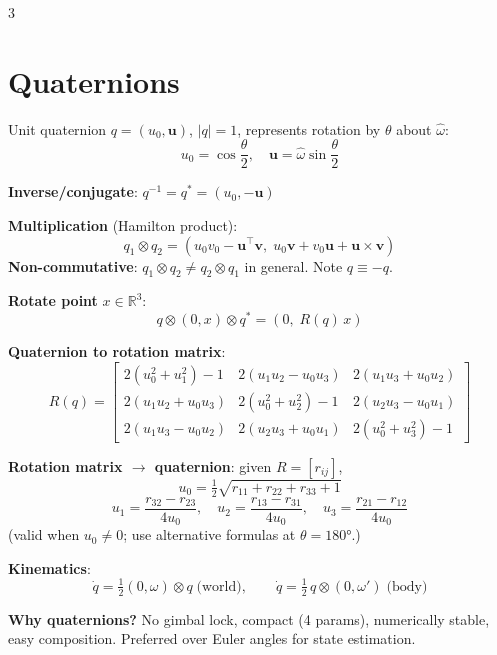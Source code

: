 \documentclass[9pt,landscape]{article}
\begin{document}
\begin{multicols}{3}
\section{Quaternions}

Unit quaternion $q=(u_0,\mathbf{u})$, $|q|=1$, represents rotation by $\theta$ about $\hat\omega$:
\[\boxed{u_0=\cos\frac{\theta}{2},\quad \mathbf{u}=\hat\omega\sin\frac{\theta}{2}}\]

\textbf{Inverse/conjugate}: $q^{-1}=q^*=(u_0,-\mathbf{u})$

\textbf{Multiplication} (Hamilton product):
\[q_1\otimes q_2=(u_0 v_0-\mathbf{u}^\top\mathbf{v},\;u_0\mathbf{v}+v_0\mathbf{u}+\mathbf{u}\times\mathbf{v})\]
\textbf{Non-commutative}: $q_1\otimes q_2\ne q_2\otimes q_1$ in general. Note $q\equiv-q$.

\textbf{Rotate point} $x\in\mathbb{R}^3$:
\[q\otimes(0,x)\otimes q^*=(0,\;R(q)\,x)\]

\textbf{Quaternion to rotation matrix}:
{\footnotesize\[R(q)=\begin{bmatrix}2(u_0^2{+}u_1^2){-}1&2(u_1u_2{-}u_0u_3)&2(u_1u_3{+}u_0u_2)\\2(u_1u_2{+}u_0u_3)&2(u_0^2{+}u_2^2){-}1&2(u_2u_3{-}u_0u_1)\\2(u_1u_3{-}u_0u_2)&2(u_2u_3{+}u_0u_1)&2(u_0^2{+}u_3^2){-}1\end{bmatrix}\]}

\textbf{Rotation matrix $\to$ quaternion}: given $R=[r_{ij}]$,
\[u_0=\tfrac{1}{2}\sqrt{r_{11}+r_{22}+r_{33}+1}\]
\[u_1=\frac{r_{32}-r_{23}}{4u_0},\quad u_2=\frac{r_{13}-r_{31}}{4u_0},\quad u_3=\frac{r_{21}-r_{12}}{4u_0}\]
(valid when $u_0\ne0$; use alternative formulas at $\theta=180°$.)

\textbf{Kinematics}:
\[\dot q=\tfrac{1}{2}(0,\omega)\otimes q\;\text{(world)},\qquad\dot q=\tfrac{1}{2}\,q\otimes(0,\omega')\;\text{(body)}\]

\textbf{Why quaternions?} No gimbal lock, compact (4 params), numerically stable, easy composition. Preferred over Euler angles for state estimation.

\end{multicols}
\newpage
\end{document}
